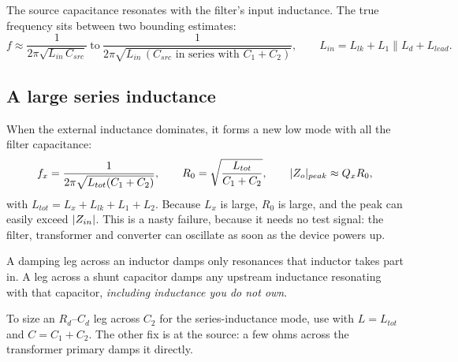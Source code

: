 The source capacitance resonates with the filter's input inductance. The true
frequency sits between two bounding estimates:
\[
	f \approx \frac{1}{2\pi\sqrt{L_{in}\,C_{src}}}
	\ \text{to}\
	\frac{1}{2\pi\sqrt{L_{in}\,(C_{src} \text{ in series with } C_1 + C_2)}},
	\qquad L_{in} = L_{lk} + L_1 \parallel L_d + L_{lead}.
\]

\subsection{A large series inductance}

When the external inductance dominates, it forms a new low mode with all the
filter capacitance:
\begin{equation}\label{eq:series-l-mode}
	f_x = \frac{1}{2\pi\sqrt{L_{tot}(C_1 + C_2)}}, \qquad
	R_0 = \sqrt{\frac{L_{tot}}{C_1 + C_2}}, \qquad
	\lvert Z_o\rvert_{peak} \approx Q_x R_0,
\end{equation}
with $L_{tot} = L_x + L_{lk} + L_1 + L_2$. Because $L_x$ is large, $R_0$ is
large, and the peak can easily exceed $\lvert Z_{in}\rvert$. This is a nasty failure,
because it needs no test signal: the filter, transformer and converter can
oscillate as soon as the device powers up.

\begin{idea}
	A damping leg across an inductor damps only resonances that inductor takes
	part in. A leg across a shunt capacitor damps any upstream inductance
	resonating with that capacitor, \emph{including inductance you do not own}.
\end{idea}

To size an $R_d$--$C_d$ leg across $C_2$ for the series-inductance mode, use
\zcref{eq:rd-cd-opt} with $L = L_{tot}$ and $C = C_1 + C_2$. The other fix is
at the source: a few ohms across the transformer primary damps it directly.

